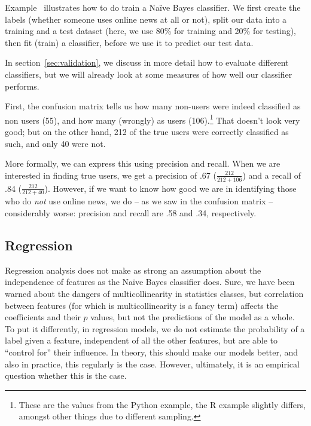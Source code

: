 
Example~ illustrates how to do train a Na\"ive Bayes
classifier.  We first create the labels (whether someone uses online
news at all or not), split our data into a training and a test dataset
(here, we use 80\% for training and 20\% for testing), then fit
(train) a classifier, before we use it to predict our test data.

In section~\ref{sec:validation}, we discuss in more detail how to
evaluate different classifiers, but we will already look at some
measures of how well our classifier performs.

First, the confusion matrix tells us how many non-users were indeed
classified as non users (55), and how many (wrongly) as users
(106).\footnote{These are the values from the Python example, the R
  example slightly differs, amongst other things due to different
  sampling.} That doesn't look very good; but on the other hand, 212
of the true users were correctly classified as such, and only 40 were
not.

More formally, we can express this using precision and recall. When we
are interested in finding true users, we get a precision of .67
($\frac{212}{212+106}$) and a recall of .84 ($\frac{212}{212+40}$).
However, if we want to know how good we are in identifying those who
do \emph{not} use online news, we do -- as we saw in the confusion
matrix -- considerably worse: precision and recall are .58 and .34,
respectively.



\subsection{Regression}
Regression analysis does not make as strong an assumption about the
independence of features as the Na\"ive Bayes classifier does.  Sure,
we have been warned about the dangers of multicollinearity in
statistics classes, but correlation between features (for which is
multicollinearity is a fancy term) affects the coefficients and their
$p$ values, but not the predictions of the model as a whole.  To put
it differently, in regression models, we do not estimate the
probability of a label given a feature, independent of all the other
features, but are able to ``control for'' their influence.  In theory,
this should make our models better, and also in practice, this
regularly is the case. However, ultimately, it is an empirical
question whether this is the case.

